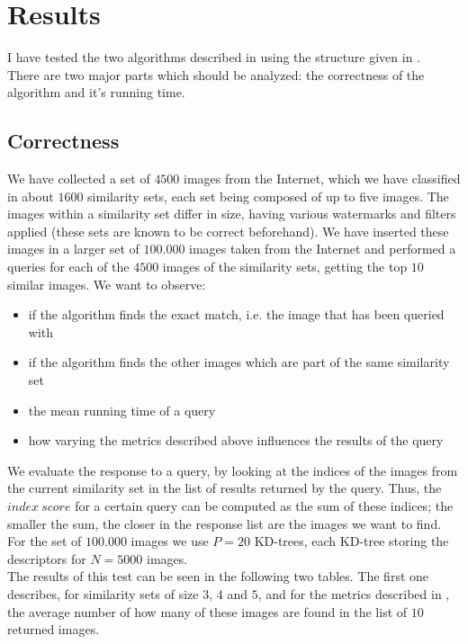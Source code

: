 \chapter{Results}

I have tested the two algorithms described in  using the structure given in .\\
There are two major parts which should be analyzed: the correctness of the algorithm and it's running time.

\section{Correctness}

We have collected a set of $4500$ images from the Internet, which we have classified in about $1600$ similarity sets, each set being composed of up to five images. The images within a similarity set differ in size, having various watermarks and filters applied (these sets are known to be correct beforehand). We have inserted these images in a larger set of $100.000$ images taken from the Internet and performed a queries for each of the $4500$ images of the similarity sets, getting the top $10$ similar images. We want to observe:
\begin{itemize}
	\item if the algorithm finds the exact match, i.e. the image that has been queried with
	\item if the algorithm finds the other images which are part of the same similarity set
	\item the mean running time of a query
	\item how varying the metrics described above influences the results of the query
\end{itemize}

We evaluate the response to a query, by looking at the indices of the images from the current similarity set in the list of results returned by the query. Thus, the $index\ score$ for a certain query can be computed as the sum of these indices; the smaller the sum, the closer in the response list are the images we want to find. \\
For the set of $100.000$ images we use $P=20$ KD-trees, each KD-tree storing the descriptors for $N=5000$ images.\\
The results of this test can be seen in the following two tables. The first one describes, for similarity sets of size $3$, $4$ and $5$, and for the metrics described in , the average number of how many of these images are found in the list of $10$ returned images.\\

